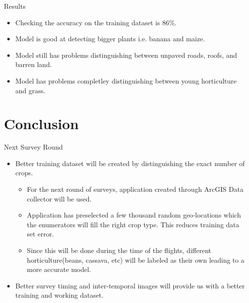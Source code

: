 \documentclass{beamer}
\begin{document}
\begin{frame}{Results}
	\begin{itemize}
		\item Checking the accuracy on the training dataset is 86\%.
		\item Model is good at detecting bigger plants i.e. banana and maize.
		\item Model still has problems distinguishing between unpaved roads, roofs, and barren land.
		\item Model has problems completley distinguishing between young horticulture and grass. 
	\end{itemize}
\end{frame}

\section{Conclusion}
\begin{frame}{Next Survey Round}
\begin{itemize} 
	\item Better training dataset will be created by distinguishing the exact number of crops. 
	\begin{itemize}
		\item For the next round of surveys, application created through ArcGIS Data collector will be used. 
		\item Application has preselected a few thousand random geo-locations which the enumerators will fill the right crop type. This reduces training data set error.
		\item Since this will be done during the time of the flights, different horticulture(beans, cassava, etc) will be labeled as their own leading to a more accurate model.
	\end{itemize}
	\item Better survey timing and inter-temporal images will provide us with a better training and working dataset. 
\end{itemize}
\end{frame}
\end{document}
